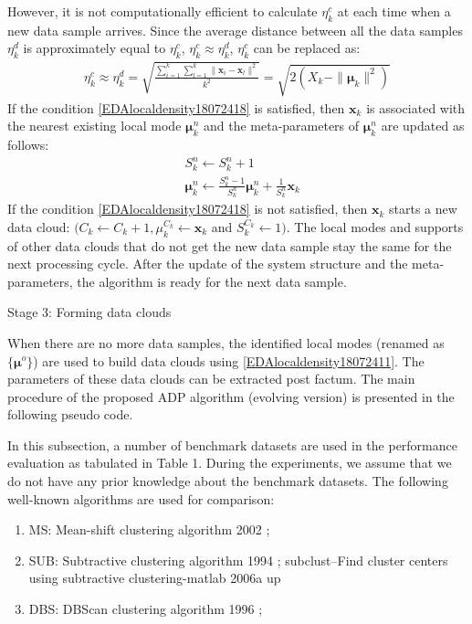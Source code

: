 {However, it is not computationally efficient to calculate $\eta_k^c$ at each time when a new data sample arrives. Since the average distance between all the data samples $\eta_k^d$ is approximately equal to $\eta_k^c$, $\eta_k^c\approx \eta_k^d$, $\eta_k^c$ can be replaced as:
\begin{align}\label{EDAlocaldensity18072419}
  \eta_k^c\approx \eta_k^d=\sqrt{\frac{\sum_{i=1}^k\sum_{l=1}^k \|\bm x _i-\bm x _l\|^2 }{k^2}}=\sqrt{2(X_k-\|\bm\mu_k\|^2)}
\end{align}
If the condition \eqref{EDAlocaldensity18072418} is satisfied, then $\bm x_k$ is associated with the nearest existing local mode $\bm \mu^n_k$ and the meta-parameters of $\bm \mu^n_k$ are updated as follows:
\begin{align}
  &S^n_k \leftarrow S^n_k + 1 \label{EDAlocaldensity18072420}\\
  &\bm\mu^n_ k \leftarrow \frac{S^n_k  - 1}{S^n_k}\bm \mu^n_k + \frac 1 {S^n_k}\bm x_k\label{EDAlocaldensity18072421}
\end{align}
If the condition \eqref{EDAlocaldensity18072418} is not satisfied, then $\bm x_k$ starts a new data cloud: $(C_k \leftarrow C_k + 1,\mu_k^{C_k} \leftarrow \bm x_k$ and $S_k^{C_k} \leftarrow 1)$.
The local modes and supports of other data clouds that do not get the new data sample stay the same for the next processing cycle. After the update of the system structure and the meta-parameters, the algorithm is ready for the next data sample.

Stage 3: Forming data clouds

When there are no more data samples, the identified local modes (renamed as $\{\bm \mu^o\}$) are used to build data clouds using \eqref{EDAlocaldensity18072411}. The parameters of these data clouds can be extracted post factum.
The main procedure of the proposed ADP algorithm (evolving version) is presented in the following pseudo code.

In this subsection, a number of benchmark datasets are used in the performance evaluation as tabulated in Table 1. During the experiments, we assume that we do not have any prior knowledge about the benchmark datasets. The following well-known algorithms are used for comparison: 
\begin{enumerate}[label=\Roman*,align=left]
  \item MS: Mean-shift clustering algorithm 2002 \cite{DPComaniciu2002-5678};
  \item SUB: Subtractive clustering algorithm 1994 \cite{Chiu1994-5679};  subclust--Find cluster centers using subtractive clustering-matlab 2006a up
  \item DBS: DBScan clustering algorithm 1996 \cite{EsterKriegel1996-5680};


\end{enumerate}}
